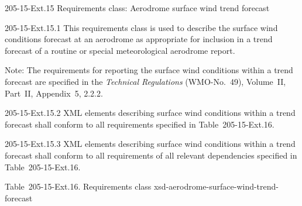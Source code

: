 205-15-Ext.15 Requirements class: Aerodrome surface wind trend forecast

205-15-Ext.15.1 This requirements class is used to describe the surface wind conditions forecast at an aerodrome as appropriate for inclusion in a trend forecast of a routine or special meteorological aerodrome report.

Note: The requirements for reporting the surface wind conditions within a trend forecast are specified in the \emph{Technical Regulations} (WMO-No.~49), Volume~II, Part~II, Appendix~5, 2.2.2.

205-15-Ext.15.2 XML elements describing surface wind conditions within a trend forecast shall conform to all requirements specified in Table~205-15-Ext.16.

205-15-Ext.15.3 XML elements describing surface wind conditions within a trend forecast shall conform to all requirements of all relevant dependencies specified in Table~205-15-Ext.16.

Table~205-15-Ext.16. Requirements class xsd-aerodrome-surface-wind-trend-forecast

